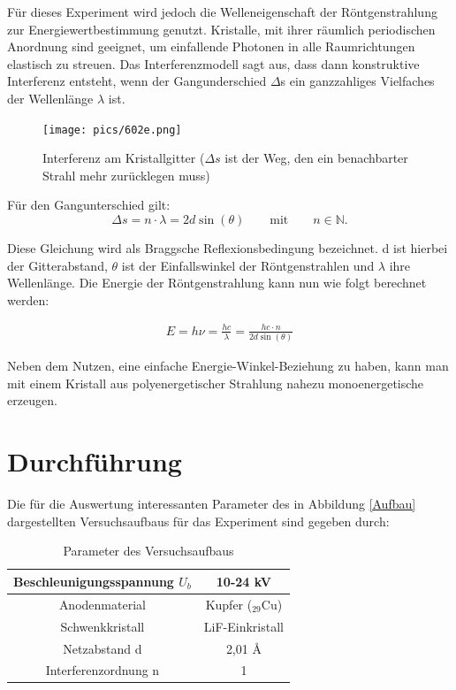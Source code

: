 Für dieses Experiment wird jedoch die Welleneigenschaft der Röntgenstrahlung zur Energiewertbestimmung genutzt. Kristalle,
mit ihrer räumlich periodischen Anordnung sind geeignet, um einfallende Photonen in alle Raumrichtungen elastisch zu streuen.
Das Interferenzmodell sagt aus, dass dann konstruktive Interferenz entsteht, wenn der Gangunderschied $\Delta$s ein
ganzzahliges Vielfaches der Wellenlänge $\lambda$ ist.

\begin{figure}[H]
\texttt{[image: pics/602e.png]}
\centering
\caption{Interferenz am Kristallgitter ($\Delta s$ ist der Weg, den ein benachbarter Strahl mehr zurücklegen muss)}
\label{Gitter}
\end{figure}

Für den Gangunterschied gilt:
\begin{equation}
 \Delta s = n \cdot \lambda = 2d\sin(\theta) \qquad \text{mit} \qquad n \in \mathbb{N}.
\end{equation}

Diese Gleichung wird als Braggsche Reflexionsbedingung bezeichnet. d ist hierbei der Gitterabstand, $\theta$ ist der
Einfallswinkel der Röntgenstrahlen und $\lambda$ ihre Wellenlänge. Die Energie der Röntgenstrahlung kann nun wie folgt
berechnet werden:

\begin{align}
E = h\nu = \frac{h c}{\lambda} = \frac{h c\cdot n}{2d\sin(\theta)}
\label{Bragg}
\end{align}

Neben dem Nutzen, eine einfache Energie-Winkel-Beziehung zu haben, kann man mit einem Kristall aus polyenergetischer
Strahlung nahezu monoenergetische erzeugen.

\section{Durchführung}
Die für die Auswertung interessanten Parameter des in Abbildung \ref{Aufbau} dargestellten Versuchsaufbaus für das Experiment
sind gegeben durch:

\renewcommand{\arraystretch}{1.5}
\begin{table}[H]
 \begin{tabular}{|c|c|}
\hline
Beschleunigungsspannung $U_b$ & 10-24 kV\\
\hline
Anodenmaterial & Kupfer ($_{29}$Cu)\\
\hline
Schwenkkristall & LiF-Einkristall\\
\hline
Netzabstand d & 2,01 \AA \\
\hline
Interferenzordnung n & 1\\
\hline
\end{tabular}
\caption{Parameter des Versuchsaufbaus}
\end{table}
\renewcommand{\arraystretch}{1}

